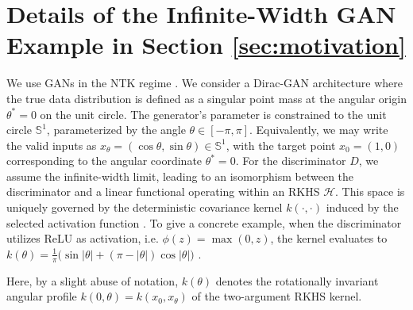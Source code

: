 \documentclass[letter,11pt]{article}
\begin{document}
\section{Details of the Infinite-Width GAN Example in Section \ref{sec:motivation}}\label{sec:gan}
We use GANs in the NTK regime \cite{jacot2018neural}. We consider a Dirac-GAN architecture \cite{mescheder2018training} where the true data distribution is defined as a singular point mass at the angular origin $\theta^* = 0$ on the unit circle. The generator's parameter is constrained to the unit circle $\mathbb{S}^1$, parameterized by the angle $\theta \in [-\pi, \pi]$. Equivalently, we may write the valid inputs as $x_\theta=(\cos\theta,\sin\theta)\in\mathbb{S}^1$, with the target point $x_0=(1,0)$ corresponding to the angular coordinate $\theta^*=0$. For the discriminator $D$, we assume the infinite-width limit, leading to an isomorphism between the discriminator and a linear functional operating within an RKHS $\mathcal{H}$. This space is uniquely governed by the deterministic covariance kernel $k(\cdot, \cdot)$ induced by the selected activation function \cite{jacot2018neural}. To give a concrete example, when the discriminator utilizes ReLU as activation, i.e. $\phi(z) = \max(0, z)$, the kernel evaluates to
$k(\theta) = \frac{1}{\pi} \big( \sin |\theta| + (\pi - |\theta|) \cos |\theta| \big)$ \cite{arora2019fine,li2019enhanced,golikov2022neural}.

Here, by a slight abuse of notation, $k(\theta)$ denotes the rotationally invariant angular profile $k(0,\theta)=k(x_0,x_\theta)$ of the two-argument RKHS kernel.
\end{document}

